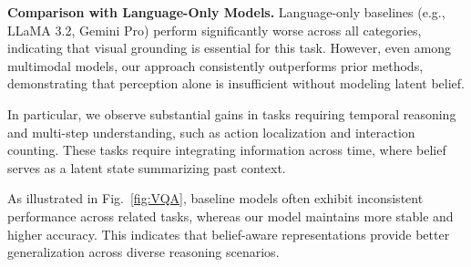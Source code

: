 \documentclass[letterpaper, 10 pt, conference]{ieeeconf}  %
\begin{document}
\medskip

\textbf{Comparison with Language-Only Models.}
Language-only baselines (e.g., LLaMA 3.2, Gemini Pro) perform significantly worse across all categories, indicating that visual grounding is essential for this task. However, even among multimodal models, our approach consistently outperforms prior methods, demonstrating that perception alone is insufficient without modeling latent belief.





In particular, we observe substantial gains in tasks requiring temporal reasoning and multi-step understanding, such as action localization and interaction counting. These tasks require integrating information across time, where belief serves as a latent state summarizing past context.

As illustrated in Fig.~\ref{fig:VQA}, baseline models often exhibit inconsistent performance across related tasks, whereas our model maintains more stable and higher accuracy. This indicates that belief-aware representations provide better generalization across diverse reasoning scenarios.















      
   




 

\addtolength{\textheight}{-2cm}   %
\end{document}
